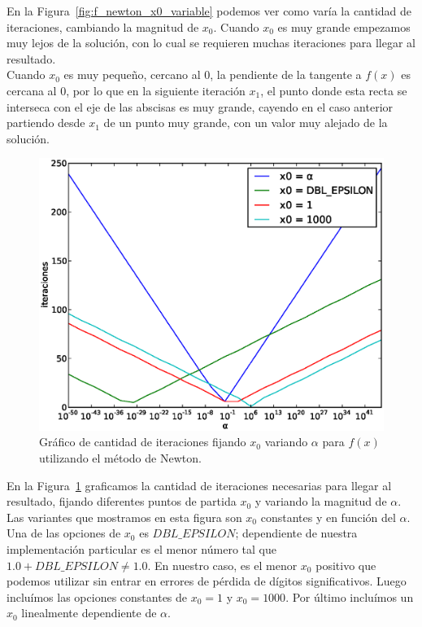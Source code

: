En la Figura~\ref{fig:f_newton_x0_variable}  podemos ver como varía la cantidad
de iteraciones, cambiando la magnitud de $x_0$. Cuando $x_0$ es muy grande
empezamos muy lejos de la solución, con lo cual se requieren muchas iteraciones
para llegar al resultado.\\

Cuando $x_0$ es muy pequeño, cercano al $0$, la pendiente de la tangente a
$f(x)$ es cercana al 0, por lo que en la siguiente iteración $x_1$, el punto donde
esta recta se interseca con el eje de las abscisas es muy grande, cayendo en el
caso anterior partiendo desde $x_1$ de un punto muy grande, con un valor muy
alejado de la solución.\\

\begin{figure}[!htbp]
  \begin{center}
    \includegraphics[scale=0.5]{graficos/new/f_newton_x0_fijo_1.eps}
    \caption{\label{fig:f_newton_x0_fijo_1} Gráfico de cantidad de iteraciones fijando $x_0$ variando $\alpha$ para $f(x)$ utilizando el método de Newton.}
  \end{center}
\end{figure}

En la Figura~\ref{fig:f_newton_x0_fijo_1} graficamos la cantidad de iteraciones
necesarias para llegar al resultado, fijando diferentes puntos de partida $x_0$
y variando la magnitud de $\alpha$. Las variantes que mostramos en esta figura
son $x_0$ constantes y en función del $\alpha$. Una de las opciones de $x_0$ es
$\textit{DBL\_EPSILON}$; dependiente de nuestra implementación particular es el
menor número tal que $1.0 + \textit{DBL\_EPSILON} \ne 1.0$. En nuestro caso, es
el menor $x_0$ positivo que podemos utilizar sin entrar en errores de pérdida
de dígitos significativos. Luego incluímos las opciones constantes de $x_0 = 1$
y $x_0 = 1000$. Por último incluímos un $x_0$ linealmente dependiente de $\alpha$.\\

